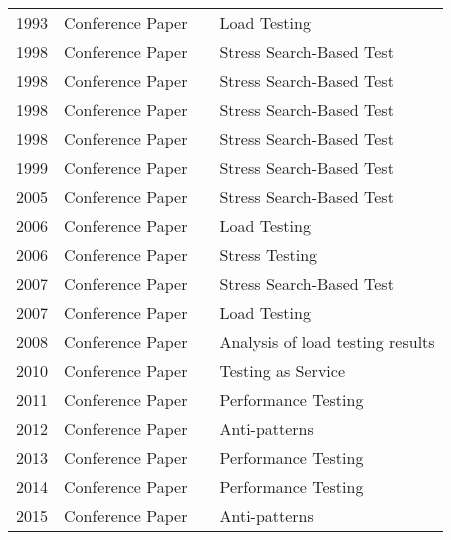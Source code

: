 \begin{longtable}{llll}
1993          & Conference Paper & \cite{Avritzer1993d}            & Load Testing                     \\
1998          & Conference Paper & \cite{Alander}                  & Stress Search-Based Test         \\
1998          & Conference Paper & \cite{Puschner1998}             & Stress Search-Based Test         \\
1998          & Conference Paper & \cite{Mueller1998}              & Stress Search-Based Test         \\
1998          & Conference Paper & \cite{Sullivan}                 & Stress Search-Based Test         \\
1999          & Conference Paper & \cite{Wegener1999}              & Stress Search-Based Test         \\
2005          & Conference Paper & \cite{Canfora}                  & Stress Search-Based Test         \\
2006          & Conference Paper & \cite{Draheim2006b}             & Load Testing                     \\
2006          & Conference Paper & \cite{Abu-nimeh2001}            & Stress Testing                   \\
2007          & Conference Paper & \cite{Penta2007}                & Stress Search-Based Test         \\
2007          & Conference Paper & \cite{Barros2007}               & Load Testing                     \\
2008          & Conference Paper & \cite{Jiang2008b}               & Analysis of load testing results \\
2010          & Conference Paper & \cite{Yu2010a}                  & Testing as Service               \\
2011          & Conference Paper & \cite{Nivas2011}                & Performance Testing              \\
    2012          & Conference Paper & \cite{Arcelli2012}              & Anti-patterns                    \\
2013          & Conference Paper & \cite{Bazilinskyy2013}          & Performance Testing              \\
2014          & Conference Paper & \cite{Gias2014}                 & Performance Testing              \\
2015          & Conference Paper & \cite{Alebrahim}                & Anti-patterns                    \\

\end{longtable}
